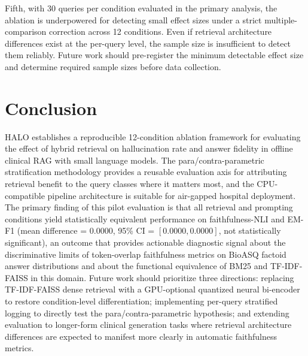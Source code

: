 \documentclass{article}
\begin{document}
Fifth, with 30 queries per condition evaluated in the primary analysis, the ablation is underpowered for detecting small effect sizes under a strict multiple-comparison correction across 12 conditions. Even if retrieval architecture differences exist at the per-query level, the sample size is insufficient to detect them reliably. Future work should pre-register the minimum detectable effect size and determine required sample sizes before data collection.

\section{Conclusion}

\label{sec:conclusion}

HALO establishes a reproducible 12-condition ablation framework for evaluating the effect of hybrid retrieval on hallucination rate and answer fidelity in offline clinical RAG with small language models. The para/contra-parametric stratification methodology provides a reusable evaluation axis for attributing retrieval benefit to the query classes where it matters most, and the CPU-compatible pipeline architecture is suitable for air-gapped hospital deployment. The primary finding of this pilot evaluation is that all retrieval and prompting conditions yield statistically equivalent performance on faithfulness-NLI and EM-F1 (mean difference = 0.0000, 95\% CI = $[0.0000, 0.0000]$, not statistically significant), an outcome that provides actionable diagnostic signal about the discriminative limits of token-overlap faithfulness metrics on BioASQ factoid answer distributions and about the functional equivalence of BM25 and TF-IDF-FAISS in this domain. Future work should prioritize three directions: replacing TF-IDF-FAISS dense retrieval with a GPU-optional quantized neural bi-encoder to restore condition-level differentiation; implementing per-query stratified logging to directly test the para/contra-parametric hypothesis; and extending evaluation to longer-form clinical generation tasks where retrieval architecture differences are expected to manifest more clearly in automatic faithfulness metrics.



\end{document}
